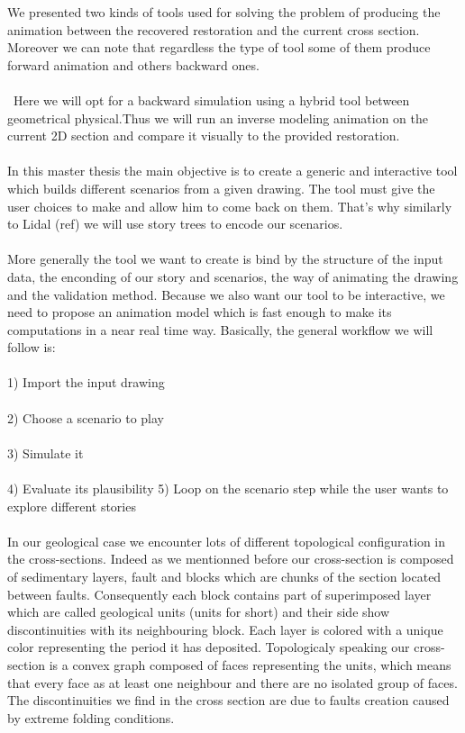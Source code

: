 \documentclass[12pt, a4paper]{memoir} %
\begin{document}
We presented two kinds of tools used for solving the problem of producing the animation between the recovered restoration and the current cross section. Moreover we can note that regardless the type of tool some of them produce forward animation and others backward ones. \\\\\
Here we will opt for a backward simulation using a hybrid tool between geometrical physical.Thus we will run an inverse modeling animation on the current 2D section and compare it visually to the provided restoration.\\\\

In this master thesis the main objective is to create a generic and interactive tool which builds different scenarios from a given drawing. The tool must give the user choices to make and allow him to come back on them. That's why similarly to Lidal (ref) we will use story trees to encode our scenarios.\\\\

More generally the tool we want to create is bind by the structure of the input data, the enconding of our story and scenarios, the way of animating the drawing and the validation method. Because we also want our tool to be interactive, we need to propose an animation model which is fast enough to make its computations in a near real time way. Basically, the general workflow we will follow is: \\\\1) Import the input drawing\\\\ 2) Choose a scenario to play \\\\3) Simulate it \\\\ 4) Evaluate its plausibility 5) Loop on the scenario step while the user wants to explore different stories\\\\

In our geological case we encounter lots of different topological configuration in the cross-sections. Indeed as we mentionned before our cross-section is composed of sedimentary layers, fault and blocks which are chunks of the section located between faults. Consequently each block contains part of superimposed layer which are called geological units (units for short) and their side show discontinuities with its neighbouring block. Each layer is colored with a unique color representing the period it has deposited. Topologicaly speaking our cross-section is a convex graph composed of faces representing the units, which means that every face as at least one neighbour and there are no isolated group of faces. The discontinuities we find in the cross section are due to faults creation caused by extreme folding conditions.\\\\
\end{document}
